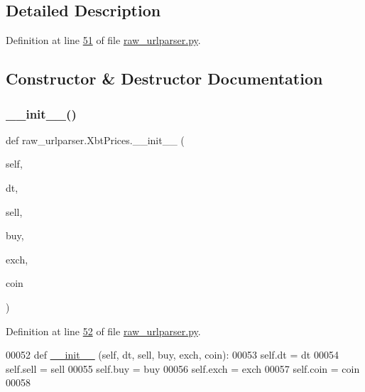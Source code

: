 \subsection{Detailed Description}


Definition at line \hyperlink{raw__urlparser_8py_source_l00051}{51} of file \hyperlink{raw__urlparser_8py_source}{raw\+\_\+urlparser.\+py}.



\subsection{Constructor \& Destructor Documentation}
\mbox{\label{classraw__urlparser_1_1_xbt_prices_ae5bf5349c30bd61107bcd3259fc1f455}} 
\subsubsection{\texorpdfstring{\+\_\+\+\_\+init\+\_\+\+\_\+()}{\_\_init\_\_()}}
{\footnotesize\ttfamily def raw\+\_\+urlparser.\+Xbt\+Prices.\+\_\+\+\_\+init\+\_\+\+\_\+ (\begin{DoxyParamCaption}\item[{}]{self,  }\item[{}]{dt,  }\item[{}]{sell,  }\item[{}]{buy,  }\item[{}]{exch,  }\item[{}]{coin }\end{DoxyParamCaption})}



Definition at line \hyperlink{raw__urlparser_8py_source_l00052}{52} of file \hyperlink{raw__urlparser_8py_source}{raw\+\_\+urlparser.\+py}.


\begin{DoxyCode}
00052     \textcolor{keyword}{def }\hyperlink{namespacestart__time_a9c9bd378729a13c96a22c8b079ea172c}{\_\_init\_\_} (self, dt, sell, buy, exch, coin):
00053         self.dt   = dt
00054         self.sell = sell
00055         self.buy  = buy
00056         self.exch = exch
00057         self.coin = coin
00058         
\end{DoxyCode}


